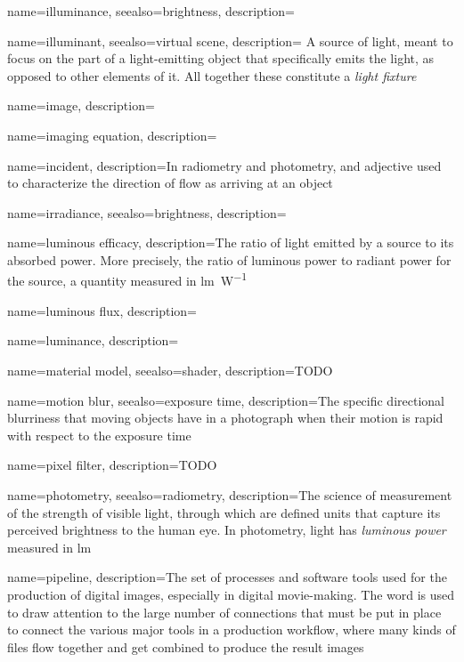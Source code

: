 {
	name=illuminance,
	seealso={brightness},
	description=\nopostdesc
}

{
	name=illuminant,
	seealso={virtual scene},
	description={
		A source of light, meant to focus on the part of a light-emitting object that
	    specifically emits the light, as opposed to other elements of it. All together
        these constitute a \textsl{light fixture}}
}

{
	name={image},
	description=\nopostdesc
}

{
	name={imaging equation},
	description=\nopostdesc
}
	
{
	name={incident},
	description={In radiometry and photometry, and adjective used to characterize the direction of
		flow as arriving at an object}
}

{
	name=irradiance,
	seealso={brightness},
	description=\nopostdesc
}

{
	name={luminous efficacy},
	description={The ratio of light emitted by a source to its absorbed power.
		More precisely, the ratio of luminous power to radiant power for the source,
		a quantity measured in \unit{\lumen\per\watt}}
}

{
	name={luminous flux},
	description=\nopostdesc
}

{
	name={luminance},
	description=\nopostdesc
}

{
	name={material model},
	seealso={shader},
	description={TODO}
}

{
	name={motion blur},
	seealso={exposure time},
	description={The specific directional blurriness that moving objects
		have in a photograph when their motion is rapid with respect 
		to the \gls{exposure time}}
}

{
	name={pixel filter},
	description={TODO}
}

{
	name={photometry},
	seealso={radiometry},
	description={The science of measurement of the strength of visible light, 
		through which are defined units that capture its perceived brightness 
		to the human eye. In photometry, light has \textsl{luminous power} 
		measured in \unit{\lumen}}
}


{
	name={pipeline},
	description={The set of processes and software tools used for the production of 
		digital images, especially in digital movie-making. The word is used to draw
		attention to the large number of connections that must be put in place to 
		connect the various major tools in a production workflow, where many kinds
		of files flow together and get combined to produce the result images}
}


